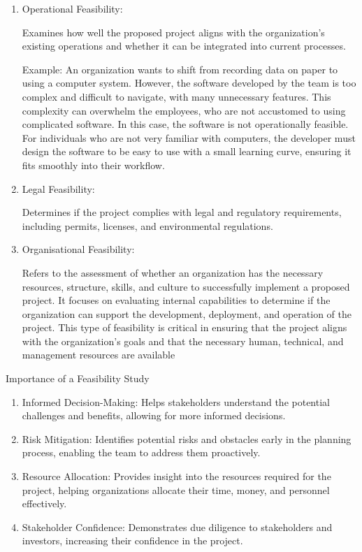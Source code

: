 \documentclass[a4paper]{article}
\begin{document}
\begin{enumerate}
    \item Operational Feasibility:

            Examines how well the proposed project aligns with the organization’s existing operations and whether it can be integrated into 
            current processes.
            
            Example: An organization wants to shift from recording data on paper to using a computer system.
            However, the software developed by the team is too complex and difficult to navigate, with many unnecessary features.
            This complexity can overwhelm the employees, who are not accustomed to using complicated software.
            In this case, the software is not operationally feasible. For individuals who are not very familiar with computers, 
            the developer must design the software to be easy to use with a small learning curve, ensuring it fits smoothly into their workflow.


    \item Legal Feasibility:
           
            Determines if the project complies with legal and regulatory requirements, including permits, licenses, and environmental regulations.
            
    \item Organisational Feasibility: 
        
        Refers to the assessment of whether an organization has the necessary resources, structure, skills, and culture to successfully implement 
        a proposed project. It focuses on evaluating internal capabilities to determine if the organization can support 
        the development, deployment, and operation of the project. This type of feasibility is critical in ensuring that the project aligns with
        the organization's goals and that the necessary human, technical, and management resources are available


\end{enumerate}

Importance of a Feasibility Study
\begin{enumerate}
    \item Informed Decision-Making: Helps stakeholders understand the potential challenges and benefits, allowing for more informed decisions.
    \item Risk Mitigation: Identifies potential risks and obstacles early in the planning process, enabling the team to address them proactively.
    \item Resource Allocation: Provides insight into the resources required for the project, helping organizations allocate their time, money, and personnel effectively.
    \item Stakeholder Confidence: Demonstrates due diligence to stakeholders and investors, increasing their confidence in the project.
\end{enumerate}
\end{document}
